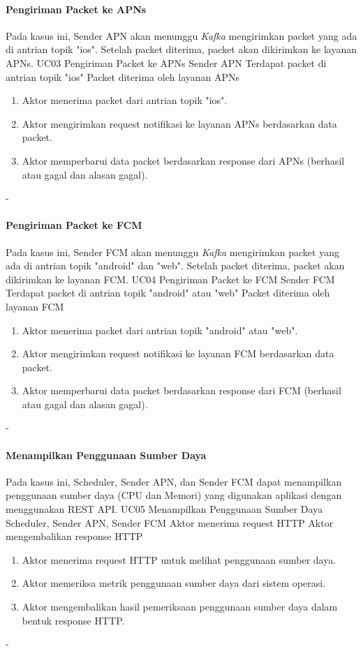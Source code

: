 \paragraph{Pengiriman Packet ke APNs}
\par Pada kasus ini, Sender APN akan menunggu \textit{Kafka} mengirimkan packet yang ada di antrian topik "ios". Setelah packet diterima, packet akan dikirimkan ke layanan APNs.
\tableUcDesc
{UC03}
{Pengiriman Packet ke APNs}
{Sender APN}
{Terdapat packet di antrian topik "ios"}
{Packet diterima oleh layanan APNs}
{
\begin{enumerate}
    \item Aktor menerima packet dari antrian topik "ios".
    \item Aktor mengirimkan request notifikasi ke layanan APNs berdasarkan data packet.
    \item Aktor memperbarui data packet berdasarkan response dari APNs (berhasil atau gagal dan alasan gagal).
\end{enumerate}
}
{-}

\paragraph{Pengiriman Packet ke FCM}
\par Pada kasus ini, Sender FCM akan menunggu \textit{Kafka} mengirimkan packet yang ada di antrian topik "android" dan "web". Setelah packet diterima, packet akan dikirimkan ke layanan FCM.
\tableUcDesc
{UC04}
{Pengiriman Packet ke FCM}
{Sender FCM}
{Terdapat packet di antrian topik "android" atau "web"}
{Packet diterima oleh layanan FCM}
{
\begin{enumerate}
    \item Aktor menerima packet dari antrian topik "android" atau "web".
    \item Aktor mengirimkan request notifikasi ke layanan FCM berdasarkan data packet.
    \item Aktor memperbarui data packet berdasarkan response dari FCM (berhasil atau gagal dan alasan gagal).
\end{enumerate}
}
{-}

\paragraph{Menampilkan Penggunaan Sumber Daya}
\par Pada kasus ini, Scheduler, Sender APN, dan Sender FCM dapat menampilkan penggunaan sumber daya (CPU dan Memori) yang digunakan aplikasi dengan menggunakan REST API.
\tableUcDesc
{UC05}
{Menampilkan Penggunaan Sumber Daya}
{Scheduler, Sender APN, Sender FCM}
{Aktor menerima request HTTP}
{Aktor mengembalikan response HTTP}
{
	\begin{enumerate}
		\item Aktor menerima request HTTP untuk melihat penggunaan sumber daya.
		\item Aktor memeriksa metrik penggunaan sumber daya dari sistem operasi.
		\item Aktor mengembalikan hasil pemeriksaan penggunaan sumber daya dalam bentuk response HTTP.
	\end{enumerate}
}
{-}

